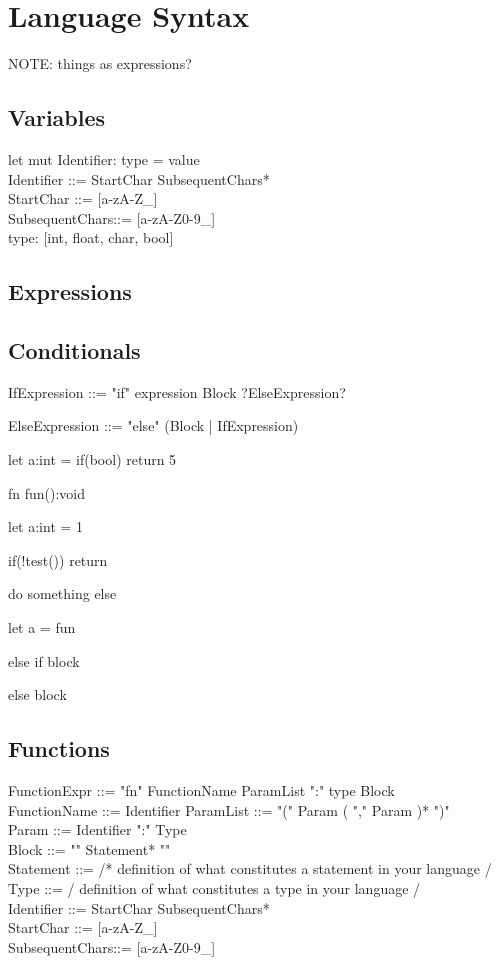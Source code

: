 \section{Language Syntax}\label{app:syntax}
NOTE: things as expressions?
\subsection{Variables}

let mut Identifier: type = value\\

Identifier ::= StartChar SubsequentChars*\\
StartChar      ::= [a-zA-Z\_]\\
SubsequentChars::= [a-zA-Z0-9\_]\\

type: [int, float, char, bool]

\subsection{Expressions}


\subsection{Conditionals}

IfExpression ::= "if" expression Block ?ElseExpression?

ElseExpression ::= "else" (Block | IfExpression)

let a:int = if(bool) return 5

fn fun():void{

 let a:int = 1
 
 if(!test()) {return }
 
 do something else
 

}





let a = fun

else if block

else block




\subsection{Functions}
FunctionExpr      ::= "fn" FunctionName ParamList ":" type Block\\
FunctionName	  ::= Identifier
ParamList         ::= "(" Param ( "," Param )* ")"\\
Param             ::= Identifier ":" Type\\
Block             ::= "{" Statement* "}"\\
Statement         ::= /* definition of what constitutes a statement in your language /\\
Type              ::= / definition of what constitutes a type in your language /\\
Identifier ::= StartChar SubsequentChars*\\
StartChar      ::= [a-zA-Z\_]\\
SubsequentChars::= [a-zA-Z0-9\_]\\

